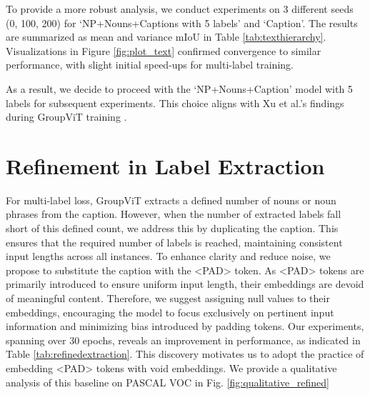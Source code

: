 To provide a more robust analysis, we conduct experiments on 3 different seeds (0, 100, 200) for `NP+Nouns+Captions with 5 labels' and `Caption'. The results are summarized as mean and variance mIoU in Table \ref{tab:texthierarchy}. Visualizations in Figure \ref{fig:plot_text} confirmed convergence to similar performance, with slight initial speed-ups for multi-label training.

As a result, we decide to proceed with the `NP+Nouns+Caption' model with 5 labels for subsequent experiments. This choice aligns with Xu et al.'s findings during GroupViT training \cite{xu2022groupvit}.



%
\section{Refinement in Label Extraction}
\label{sec:ftre}
For multi-label loss, GroupViT extracts a defined number of nouns or noun phrases from the caption. However, when the number of extracted labels fall short of this defined count, we address this by duplicating the caption. This ensures that the required number of labels is reached, maintaining consistent input lengths across all instances. To enhance clarity and reduce noise, we propose to substitute the caption with the <PAD> token. As <PAD> tokens are primarily introduced to ensure uniform input length, their embeddings are devoid of meaningful content. Therefore, we suggest assigning null values to their embeddings, encouraging the model to focus exclusively on pertinent input information and minimizing bias introduced by padding tokens. Our experiments, spanning over 30 epochs, reveals an improvement in performance, as indicated in Table \ref{tab:refinedextraction}. This discovery motivates us to adopt the practice of embedding <PAD> tokens with void embeddings. We provide a qualitative analysis of this baseline on PASCAL VOC in Fig. \ref{fig:qualitative_refined}


